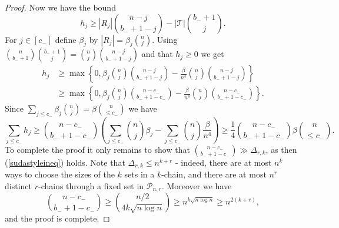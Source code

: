 \documentclass[12pt]{article}
\numberwithin{equation}{section}
\def\P{\mathcal{P}}
\def\T{\mathcal{T}}
\begin{document}
\begin{proof}
Now we have the bound
\begin{equation}\label{referringforjozsi}
h_j \geq |R_j|\binom{n-j}{b_-+1-j}-|\T|\binom{b_-+1}{j}.
\end{equation}
For $j\in [c_-]$ define $\beta_j$ by $|R_j|=\beta_j\binom{n}{j}$. Using $\binom{n}{b_-+1}\binom{b_-+1}{j}=\binom{n}{j}\binom{n-j}{b_-+1-j}$ and that $h_j\geq 0$ we get
\begin{equation*}
\begin{split}
h_j &\geq \max\left\{0,\beta_j\binom{n}{j}\binom{n-j}{b_-+1-j}-\frac{\beta}{n^4}\binom{n}{j}\binom{n-j}{b_-+1-j}\right\}\\ &\geq \max\left\{0,\beta_j\binom{n}{j}\binom{n-c_-}{b_-+1-c_-}-\frac{\beta}{n^4}\binom{n}{j}\binom{n-c_-}{b_-+1-c_-}\right\}.
\end{split}
\end{equation*}
Since $\sum_{j\leq c_-}\beta_j\binom{n}{j}=\beta\binom{n}{\leq c_-}$ we have
$$\sum_{j\leq c_-}h_j\geq \binom{n-c_-}{b_-+1-c_-}\left( \sum_{j\leq c_-} \binom{n}{j}\beta_j - \sum_{j\leq c_-}\binom{n}{j}\frac{\beta}{n^4}\right)\geq \frac{1}{4}\binom{n-c_-}{b_-+1-c_-}\beta\binom{n}{\leq c_-}.$$
To complete the proof it only remains to show that $\binom{n-c_-}{b_-+1-c_-}\gg \Delta_{r,k}$, as then (\ref{sudastyleineq}) holds. Note that $\Delta_{r,k}\leq n^{k+r}$ - indeed, there are at most $n^k$ ways to choose the sizes of the $k$ sets in a $k$-chain, and there are at most $n^r$ distinct $r$-chains through a fixed set in $\P_{n,r}$. Moreover we have
$$\binom{n-c_-}{b_-+1-c_-}\geq \binom{n/2}{4k\sqrt{n\log n}}\geq n^{k\sqrt{n\log n}}\geq n^{2(k+r)},$$
and the proof is complete.
\end{proof}
\end{document}
